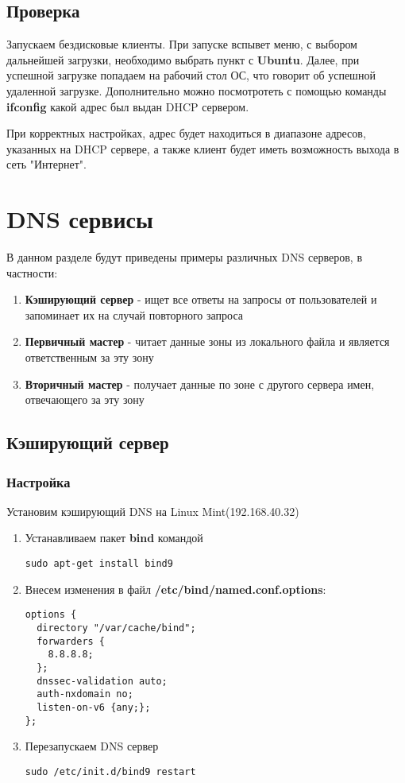 \documentclass[a4paper, 12pt]{article}		%
\begin{document}
\subsection{Проверка}
Запускаем бездисковые клиенты. При запуске вспывет меню, с выбором дальнейшей загрузки, необходимо выбрать пункт с \textbf{Ubuntu}. Далее, при успешной загрузке попадаем на рабочий стол ОС, что говорит об успешной удаленной загрузке. Дополнительно можно посмотротеть с помощью команды \textbf{ifconfig} какой адрес был выдан DHCP сервером. 

При корректных настройках, адрес будет находиться в диапазоне адресов, указанных на DHCP сервере, а также клиент будет иметь возможность выхода в сеть "Интернет".

\section{DNS сервисы}
В данном разделе будут приведены примеры различных DNS серверов, в частности:
\begin{enumerate}
\item \textbf{Кэширующий сервер} - ищет все ответы на запросы от пользователей и запоминает их на случай повторного запроса
\item \textbf{Первичный мастер} - читает данные зоны из локального файла и является ответственным за эту зону
\item \textbf{Вторичный мастер} - получает данные по зоне с другого сервера имен,
отвечающего за эту зону
\end{enumerate}

\subsection{Кэширующий сервер}
\subsubsection{Настройка}
Установим кэширующий DNS на Linux Mint(192.168.40.32)
\begin{enumerate}
\item Устанавливаем пакет \textbf{bind} командой
\begin{lstlisting}[language={}]
sudo apt-get install bind9
\end{lstlisting}
\item Внесем изменения в файл \textbf{/etc/bind/named.conf.options}:
\begin{lstlisting}[language={}]
options {
  directory "/var/cache/bind";
  forwarders {
    8.8.8.8;
  };
  dnssec-validation auto;
  auth-nxdomain no;
  listen-on-v6 {any;};
};
\end{lstlisting}
\item Перезапускаем DNS сервер
\begin{lstlisting}[language={}]
sudo /etc/init.d/bind9 restart
\end{lstlisting}
\end{enumerate}
\end{document}
